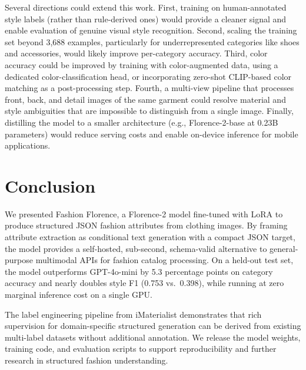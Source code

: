 \documentclass[10pt,twocolumn]{article}
\begin{document}
Several directions could extend this work.  First, training on
human-annotated style labels (rather than rule-derived ones) would provide
a cleaner signal and enable evaluation of genuine visual style recognition.
Second, scaling the training set beyond 3,688 examples, particularly
for underrepresented categories like shoes and accessories, would likely
improve per-category accuracy.  Third, color accuracy could be improved
by training with color-augmented data, using a dedicated color-classification
head, or incorporating zero-shot CLIP-based color matching as a
post-processing step.  Fourth, a multi-view pipeline that
processes front, back, and detail images of the same garment could
resolve material and style ambiguities that are impossible to distinguish
from a single image.  Finally, distilling the model to a smaller
architecture (e.g., Florence-2-base at 0.23B parameters) would reduce
serving costs and enable on-device inference for mobile applications.

\section{Conclusion}

We presented Fashion Florence, a Florence-2 model fine-tuned with LoRA to
produce structured JSON fashion attributes from clothing images.  By framing
attribute extraction as conditional text generation with a compact JSON
target, the model provides a self-hosted, sub-second, schema-valid
alternative to general-purpose multimodal APIs for fashion catalog
processing.  On a held-out test set, the model outperforms GPT-4o-mini by
5.3 percentage points on category accuracy and nearly doubles style F1
(0.753 vs.\ 0.398), while running at zero marginal inference cost on a
single GPU.

The label engineering pipeline from iMaterialist demonstrates
that rich supervision for domain-specific structured generation can be
derived from existing multi-label datasets without additional annotation.
We release the model weights, training code, and evaluation scripts to
support reproducibility and further research in structured fashion
understanding.
\end{document}
